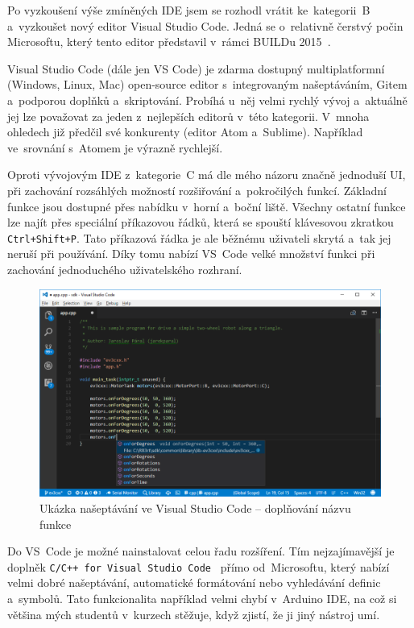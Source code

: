Po vyzkoušení výše zmíněných IDE jsem se rozhodl vrátit ke~kategorii~B a~vyzkoušet nový editor Visual Studio Code. 
Jedná se o~relativně čerstvý počin Microsoftu, který tento editor představil v~rámci BUILDu 2015~\cite{visual-studio-code_initial-release}.


Visual Studio Code (dále jen VS Code) je zdarma dostupný multiplatformní (Windows, Linux, Mac) open-source editor s~integrovaným našeptáváním, Gitem a~podporou doplňků a~skriptování.
Probíhá u~něj velmi rychlý vývoj a~aktuálně jej lze považovat za jeden z~nejlepších editorů v~této kategorii.
V~mnoha ohledech již předčil své konkurenty (editor Atom a~Sublime).
Například ve~srovnání s~Atomem je výrazně rychlejší.

Oproti vývojovým IDE z~kategorie~C má dle mého názoru značně jednoduší UI, při zachování rozsáhlých možností rozšiřování a~pokročilých funkcí. 
Základní funkce jsou dostupné přes nabídku v~horní a~boční liště. 
Všechny ostatní funkce lze najít přes speciální příkazovou řádků, která se spouští klávesovou zkratkou \texttt{Ctrl+Shift+P}. 
Tato příkazová řádka je ale běžnému uživateli skrytá a~tak jej neruší při používání.
Díky tomu nabízí VS~Code velké množství funkci při zachování jednoduchého uživatelského rozhraní.

\begin{figure}[h]
    \centering
    \includegraphics[width=\textwidth]{images/visual-studio-code_intellisense-function.png}
    \caption{Ukázka našeptávání ve Visual Studio Code -- doplňování názvu funkce}
    \label{fig:visual-studio-code_intellisense-function}
\end{figure}


Do VS~Code je možné nainstalovat celou řadu rozšíření. 
Tím nejzajímavější je doplněk  \texttt{C/C++ for Visual Studio Code}~\cite{vs-code_cpptools} přímo od~Microsoftu, který nabízí velmi dobré našeptávání, automatické formátování nebo vyhledávání definic a~symbolů.
Tato funkcionalita například velmi chybí v~Arduino IDE, na což si většina mých studentů v~kurzech stěžuje, když zjistí, že ji jiný nástroj umí.

